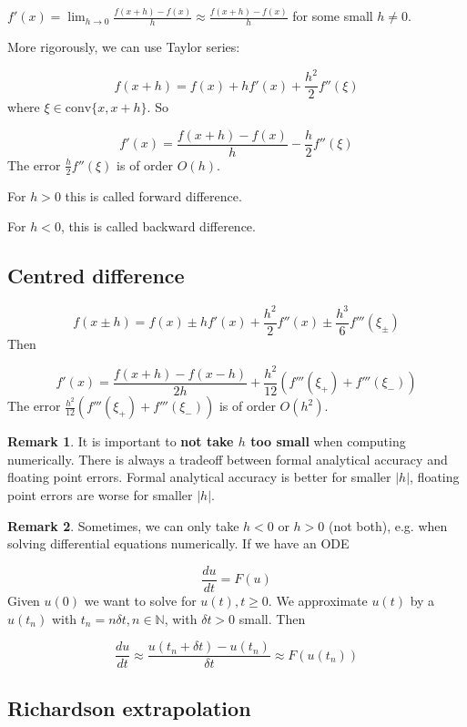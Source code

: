 \documentclass[12pt,a4paper]{article}
\theoremstyle{definition}
\newtheorem*{remark}{Remark}
\begin{document}
$f'(x) = \lim_{h \rightarrow 0} \frac{f(x + h) - f(x)}{h} \approx \frac{f(x + h) - f(x)}{h}$ for some small $h \ne 0$.

More rigorously, we can use Taylor series:

\[ f(x + h) = f(x) + h f'(x) + \frac{h^2}{2} f''(\xi) \]
where $\xi \in \text{conv} \{x, x + h \}$. So

\[ f'(x) = \frac{f(x + h) - f(x)}{h} - \frac{h}{2} f''(\xi) \]
The error $\frac{h}{2} f''(\xi)$ is of order $O(h)$.

For $h > 0$ this is called forward difference.

For $h < 0$, this is called backward difference.

\subsection{Centred difference}

\[ f(x \pm h) = f(x) \pm h f'(x) + \frac{h^2}{2} f''(x) \pm \frac{h^3}{6} f'''(\xi_{\pm}) \]
Then

\[ f'(x) = \frac{f(x + h) - f(x - h)}{2h} + \frac{h^2}{12} \left( f'''(\xi_+) + f'''(\xi_-) \right) \]
The error $\frac{h^2}{12} \left( f'''(\xi_+) + f'''(\xi_-) \right)$ is of order $O(h^2)$.

\begin{remark}
	It is important to \textbf{not take $h$ too small} when computing numerically. There is always a tradeoff between formal analytical accuracy and floating point errors. Formal analytical accuracy is better for smaller $|h|$, floating point errors are worse for smaller $|h|$.
\end{remark}

\begin{remark}
	Sometimes, we can only take $h < 0$ or $h > 0$ (not both), e.g. when solving differential equations numerically. If we have an ODE

	\[ \frac{du}{dt} = F(u) \]
	Given $u(0)$ we want to solve for $u(t), t \ge 0$. We approximate $u(t)$ by a $u(t_n)$ with $t_n = n \delta t, n \in \mathbb{N}$, with $\delta t > 0$ small. Then

	\[ \frac{du}{dt} \approx \frac{u(t_n + \delta t) - u(t_n)}{\delta t} \approx F(u(t_n)) \]
\end{remark}

\subsection{Richardson extrapolation}
\end{document}
